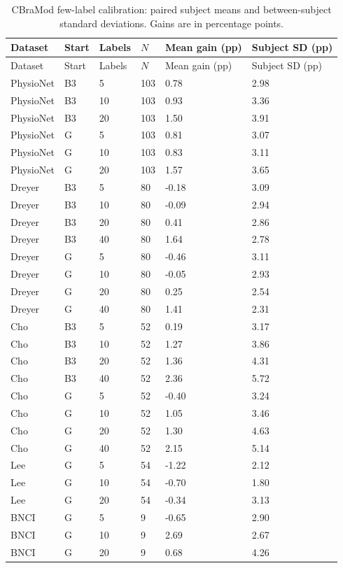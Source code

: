 \begin{longtable}{llllll}
\caption{CBraMod few-label calibration: paired subject means and between-subject standard deviations. Gains are in percentage points.}\label{tab:fewshot_distributions}\\
\toprule
Dataset & Start & Labels & $N$ & Mean gain (pp) & Subject SD (pp) \\
\midrule
\endfirsthead
\toprule
Dataset & Start & Labels & $N$ & Mean gain (pp) & Subject SD (pp) \\
\midrule
\endhead
PhysioNet & B3 & 5 & 103 & 0.78 & 2.98 \\
PhysioNet & B3 & 10 & 103 & 0.93 & 3.36 \\
PhysioNet & B3 & 20 & 103 & 1.50 & 3.91 \\
PhysioNet & G & 5 & 103 & 0.81 & 3.07 \\
PhysioNet & G & 10 & 103 & 0.83 & 3.11 \\
PhysioNet & G & 20 & 103 & 1.57 & 3.65 \\
Dreyer & B3 & 5 & 80 & -0.18 & 3.09 \\
Dreyer & B3 & 10 & 80 & -0.09 & 2.94 \\
Dreyer & B3 & 20 & 80 & 0.41 & 2.86 \\
Dreyer & B3 & 40 & 80 & 1.64 & 2.78 \\
Dreyer & G & 5 & 80 & -0.46 & 3.11 \\
Dreyer & G & 10 & 80 & -0.05 & 2.93 \\
Dreyer & G & 20 & 80 & 0.25 & 2.54 \\
Dreyer & G & 40 & 80 & 1.41 & 2.31 \\
Cho & B3 & 5 & 52 & 0.19 & 3.17 \\
Cho & B3 & 10 & 52 & 1.27 & 3.86 \\
Cho & B3 & 20 & 52 & 1.36 & 4.31 \\
Cho & B3 & 40 & 52 & 2.36 & 5.72 \\
Cho & G & 5 & 52 & -0.40 & 3.24 \\
Cho & G & 10 & 52 & 1.05 & 3.46 \\
Cho & G & 20 & 52 & 1.30 & 4.63 \\
Cho & G & 40 & 52 & 2.15 & 5.14 \\
Lee & G & 5 & 54 & -1.22 & 2.12 \\
Lee & G & 10 & 54 & -0.70 & 1.80 \\
Lee & G & 20 & 54 & -0.34 & 3.13 \\
BNCI & G & 5 & 9 & -0.65 & 2.90 \\
BNCI & G & 10 & 9 & 2.69 & 2.67 \\
BNCI & G & 20 & 9 & 0.68 & 4.26 \\
\bottomrule
\end{longtable}
